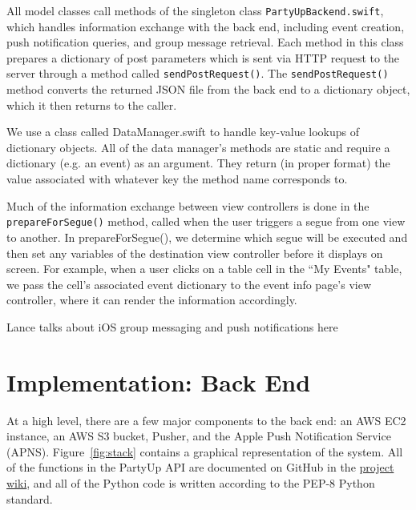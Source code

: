 \documentclass[12pt]{article}
\begin{document}
All model classes call methods of the singleton class \texttt{PartyUpBackend.swift},
which handles information exchange with the back end, including event creation,
push notification queries, and group message retrieval.
Each method in this class prepares a dictionary of post parameters which is
sent via HTTP request to the server through a method called \texttt{sendPostRequest()}.
The \texttt{sendPostRequest()} method converts the returned JSON file from the back end to a dictionary object,
which it then returns to the caller.

We use a class called DataManager.swift to handle key-value lookups of dictionary objects.
All of the data manager's methods are static and require a dictionary (e.g. an event) as an argument.
They return (in proper format) the value associated with whatever key the method name corresponds to. 

Much of the information exchange between view controllers is done in the \texttt{prepareForSegue()} method,
called when the user triggers a segue from one view to another. In prepareForSegue(),
we determine which segue will be executed and then set any variables of the destination view
controller before it displays on screen.
For example, when a user clicks on a table cell in the ``My Events" table,
we pass the cell's associated event dictionary to the event info page's view controller,
where it can render the information accordingly. 


Lance talks about iOS group messaging and push notifications here


\section{Implementation: Back End}

At a high level, there are a few major components to the back end:
an AWS EC2 instance, an AWS S3 bucket, Pusher, and the Apple Push Notification Service (APNS).
Figure~\ref{fig:stack} contains a graphical representation of the system.
All of the functions in the PartyUp API are documented on GitHub
in the \href{https://github.com/BDGL-Hacks/backend-333/wiki}{project wiki},
and all of the Python code is written according to the PEP-8 Python standard.
\end{document}
